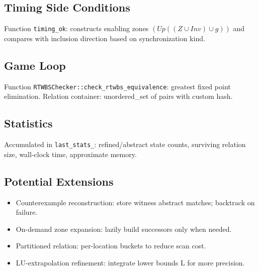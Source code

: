 \subsection{Timing Side Conditions}
Function \texttt{timing\_ok}: constructs enabling zones $(Up((Z\cup Inv)\cup g))$ and compares with inclusion direction based on synchronization kind.

\subsection{Game Loop}
Function \texttt{RTWBSChecker::check\_rtwbs\_equivalence}: greatest fixed point elimination. Relation container: unordered\_set of pairs with custom hash.

\subsection{Statistics}
Accumulated in \texttt{last\_stats\_}: refined/abstract state counts, surviving relation size, wall-clock time, approximate memory.

\subsection{Potential Extensions}
\begin{itemize}
  \item Counterexample reconstruction: store witness abstract matches; backtrack on failure.
  \item On-demand zone expansion: lazily build successors only when needed.
  \item Partitioned relation: per-location buckets to reduce scan cost.
  \item LU-extrapolation refinement: integrate lower bounds L for more precision.
\end{itemize}
